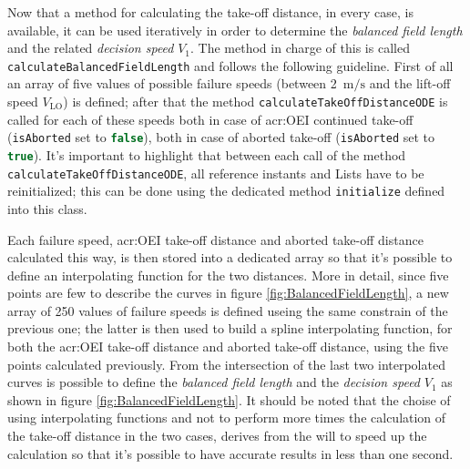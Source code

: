 \bigskip
\noindent
Now that a method for calculating the take-off distance, in every case, is available, it can be used iteratively in order to determine the \emph{balanced field length} and the related \emph{decision speed} $V_1$. The method in charge of this is called \lstinline[language=Java]!calculateBalancedFieldLength! and follows the following guideline.
%
First of all an array of five values of possible failure speeds (between 2~$\si{\meter\per\second}$ and the lift-off speed $V_{\text{LO}}$) is defined; after that the method \lstinline[language=Java]!calculateTakeOffDistanceODE! is called for each of these speeds both in case of \gls{acr:OEI} continued take-off (\lstinline[language=Java]!isAborted! set to \lstinline[language=Java]!false!), both in case of aborted take-off (\lstinline[language=Java]!isAborted! set to \lstinline[language=Java]!true!). It's important to highlight that between each call of the method \lstinline[language=Java]!calculateTakeOffDistanceODE!, all reference instants and \gls{List}s have to be reinitialized; this can be done using the dedicated method \lstinline[language=Java]!initialize! defined into this class.

\bigskip
\noindent
Each failure speed, \gls{acr:OEI} take-off distance and aborted take-off distance calculated this way, is then stored into a dedicated array so that it's possible to define an interpolating function for the two distances. More in detail, since five points are few to describe the curves in figure \ref{fig:BalancedFieldLength}, a new array of 250 values of failure speeds is defined useing the same constrain of the previous one; the latter is then used to build a spline interpolating function, for both the \gls{acr:OEI} take-off distance and aborted take-off distance, using the five points calculated previously.
%
From the intersection of the last two interpolated curves is possible to define the \emph{balanced field length} and the \emph{decision speed} $V_1$ as shown in figure \ref{fig:BalancedFieldLength}. It should be noted that the choise of using interpolating functions and not to perform more times the calculation of the take-off distance in the two cases, derives from the will to speed up the calculation so that it's possible to have accurate results in less than one second. 

